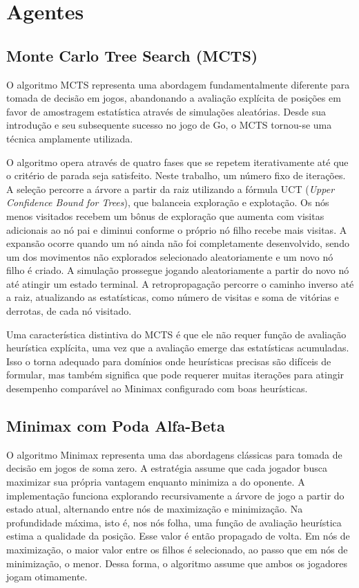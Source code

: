 \documentclass[12pt]{article}
\begin{document}
\section{Agentes}
 
\subsection{Monte Carlo Tree Search (MCTS)}
 
O algoritmo MCTS representa uma abordagem fundamentalmente diferente para tomada de decisão
em jogos, abandonando a avaliação explícita de posições em favor de amostragem estatística
através de simulações aleatórias. Desde sua introdução e seu subsequente sucesso no jogo de
Go, o MCTS tornou-se uma técnica amplamente utilizada.
 
O algoritmo opera através de quatro fases que se repetem iterativamente até que o critério de
parada seja satisfeito. Neste trabalho, um número fixo de iterações. A seleção percorre a árvore a partir
da raiz utilizando a fórmula UCT (\textit{Upper Confidence Bound for Trees}), que balanceia
exploração e explotação. Os nós menos visitados recebem um bônus de exploração que aumenta com visitas adicionais ao nó pai e diminui conforme o próprio nó filho recebe mais visitas. A expansão ocorre
quando um nó ainda não foi completamente desenvolvido, sendo um dos movimentos não explorados
selecionado aleatoriamente e um novo nó filho é criado. A simulação
prossegue jogando aleatoriamente a partir do novo nó até atingir um estado terminal. A
retropropagação percorre o caminho inverso até a raiz, atualizando as estatísticas, como número de visitas e soma de vitórias e derrotas, de cada nó visitado.
 
Uma característica distintiva do MCTS é que ele não requer função de avaliação heurística
explícita, uma vez que a avaliação emerge das estatísticas acumuladas. Isso o torna adequado para domínios
onde heurísticas precisas são difíceis de formular, mas também significa que pode requerer
muitas iterações para atingir desempenho comparável ao Minimax configurado com boas
heurísticas.
 
\subsection{Minimax com Poda Alfa-Beta}
 
O algoritmo Minimax representa uma das abordagens clássicas para tomada de decisão em
jogos de soma zero. A estratégia assume que cada jogador busca maximizar sua própria vantagem
enquanto minimiza a do oponente. A implementação funciona explorando recursivamente a árvore de
jogo a partir do estado atual, alternando entre nós de maximização e minimização. Na profundidade
máxima, isto é, nos nós folha, uma função de avaliação heurística estima a qualidade da posição. Esse
valor é então propagado de volta. Em nós de maximização, o maior valor entre os filhos é
selecionado, ao passo que em nós de minimização, o menor. Dessa forma, o algoritmo assume que ambos os
jogadores jogam otimamente.
 
\end{document}
